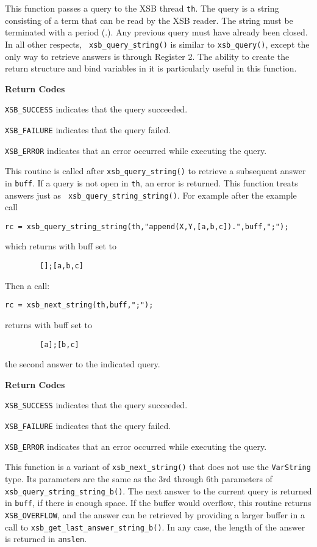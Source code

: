 \begin{description}
%
This function passes a query to the XSB thread {\tt th}.  The query is
a string consisting of a term that can be read by the XSB reader.  The
string must be terminated with a period (.).  Any previous query must
have already been closed.  In all other respects, {\tt
  xsb\_query\_string()} is similar to {\tt xsb\_query()}, except the
only way to retrieve answers is through Register 2.  The ability to
create the return structure and bind variables in it is particularly
useful in this function.

{\bf Return Codes}  
\bi
\item {\tt XSB\_SUCCESS} indicates that the query succeeded.
%
\item {\tt XSB\_FAILURE} indicates that the query failed.
%
\item {\tt XSB\_ERROR} indicates that an error occurred while
  executing the query.  
%
\ei

%
This routine is called after {\tt xsb\_query\_string()} to retrieve a
subsequent answer in {\tt buff}.  If a query is not open in {\tt th},
an error is returned.  This function treats answers just as {\tt
  xsb\_query\_string\_string()}.  For example after the example call
\begin{verbatim}
rc = xsb_query_string_string(th,"append(X,Y,[a,b,c]).",buff,";");
\end{verbatim}
which returns with buff set to 
\begin{verbatim}
        [];[a,b,c]
\end{verbatim}
Then a call:
\begin{verbatim}
rc = xsb_next_string(th,buff,";");
\end{verbatim}
returns with buff set to 
\begin{verbatim}
        [a];[b,c]
\end{verbatim}
the second answer to the indicated query. 

{\bf Return Codes}  
\bi
\item {\tt XSB\_SUCCESS} indicates that the query succeeded.
%
\item {\tt XSB\_FAILURE} indicates that the query failed.
%
\item {\tt XSB\_ERROR} indicates that an error occurred while
  executing the query.  
%
\ei

  
%
This function is a variant of {\tt xsb\_next\_string()} that does not
use the {\tt VarString} type.  Its parameters are the same as the 3rd
through 6th parameters of {\tt xsb\_query\_string\_string\_b()}.  The
next answer to the current query is returned in \verb|buff|, if there
is enough space.  If the buffer would overflow, this routine returns
{\tt XSB\_OVERFLOW}, and the answer can be retrieved by providing a
larger buffer in a call to {\tt xsb\_get\_last\_answer\_string\_b()}.
In any case, the length of the answer is returned in \verb|anslen|.


\end{description}
